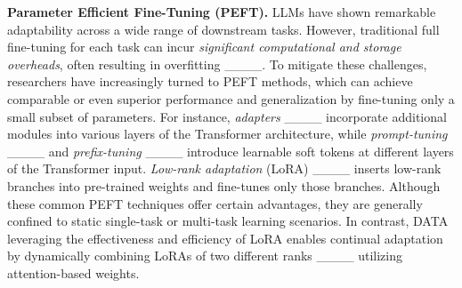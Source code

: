 \noindent \textbf{Parameter Efficient Fine-Tuning (PEFT).} LLMs have shown remarkable adaptability across a wide range of downstream tasks. However, traditional full fine-tuning for each task can incur \textit{significant computational and storage overheads}, often resulting in overfitting ____. To mitigate these challenges, researchers have increasingly turned to PEFT methods, which can achieve comparable or even superior performance and generalization by fine-tuning only a small subset of parameters.
For instance, \textit{adapters} ____ incorporate additional modules into various layers of the Transformer architecture, while \textit{prompt-tuning} ____ and \textit{prefix-tuning} ____ introduce learnable soft tokens at different layers of the Transformer input. \textit{Low-rank adaptation} (LoRA) ____ inserts low-rank branches into pre-trained weights and fine-tunes only those branches. Although these common PEFT techniques offer certain advantages, they are generally confined to static single-task or multi-task learning scenarios. In contrast, DATA leveraging the effectiveness and efficiency of LoRA enables continual adaptation by dynamically combining LoRAs of two different ranks ____ utilizing attention-based weights.

%